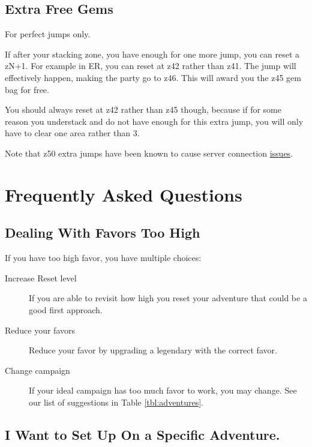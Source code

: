 \documentclass{article}
\begin{document}
\subsection{Extra Free Gems}
\label{sec:extraFreeGems}

For perfect jumps only.

If after your stacking zone, you have enough for one more jump, you can reset a zN+1.
For example in ER, you can reset at z42 rather than z41.
The jump will effectively happen, making the party go to z46.
This will award you the z45 gem bag for free.

You should always reset at z42 rather than z45 though, because if for some reason you understack and do not have enough for this extra jump, you will only have to clear one area rather than 3.

Note that z50 extra jumps have been known to cause server connection \href{https://discord.com/channels/357247482247380994/808221941722906655/1004051568145989733}{issues}.



\section{Frequently Asked Questions}




\subsection{Dealing With Favors Too High}

If you have too high favor, you have multiple choices:
\begin{description}
    \item[Increase Reset level] If you are able to revisit how high you reset your adventure that could be a good first approach.
    \item[Reduce your favors] Reduce your favor by upgrading a legendary with the correct favor.
    \item[Change campaign] If your ideal campaign has too much favor to work, you may change.
    See our list of suggestions in Table \ref{tbl:adventures}.
\end{description}

\subsection{I Want to Set Up On a Specific Adventure.}
\end{document}
